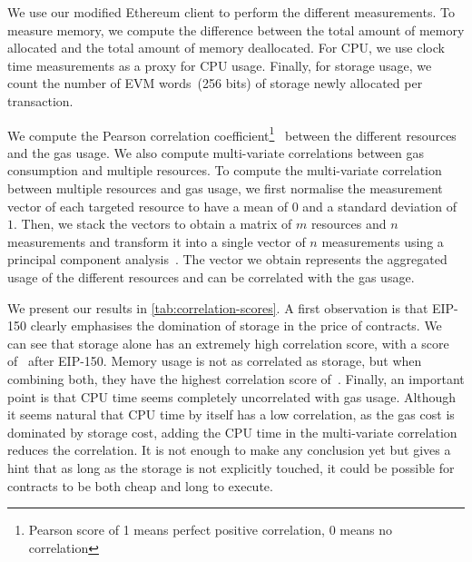 We use our modified Ethereum client to perform the different measurements. To measure memory, we compute the difference between the total amount of memory allocated and the total amount of memory deallocated.
For CPU, we use clock time measurements as a proxy for CPU usage. Finally, for storage usage, we count the number of EVM words~(256 bits) of storage newly allocated per transaction.

We compute the Pearson correlation coefficient\footnote{Pearson score of 1 means perfect positive correlation, 0 means no correlation}~\cite{boslaugh2012statistics} between the different resources and the gas usage.
We also compute multi-variate correlations between gas consumption and multiple resources.
To compute the multi-variate correlation between multiple resources and gas usage, we first normalise the measurement vector of each targeted resource to have a mean of $0$ and a standard deviation of $1$.
Then, we stack the vectors to obtain a matrix of $m$ resources and $n$ measurements and transform it into a single vector of $n$ measurements using a principal component analysis~\cite{abdi2010principal}.
The vector we obtain represents the aggregated usage of the different resources and can be correlated with the gas usage.

We present our results in \autoref{tab:correlation-scores}.
A first observation is that EIP-150 clearly emphasises the domination of storage in the price of contracts.
We can see that storage alone has an extremely high correlation score, with a score of~ after EIP-150.
Memory usage is not as correlated as storage, but when combining both, they have the highest correlation score of~.
Finally, an important point is that CPU time seems completely uncorrelated with gas usage.
Although it seems natural that CPU time by itself has a low correlation, as the gas cost is dominated by storage cost, adding the CPU time in the multi-variate correlation reduces the correlation.
It is not enough to make any conclusion yet but gives a hint that as long as the storage is not explicitly touched, it could be possible for contracts to be both cheap and long to execute.


